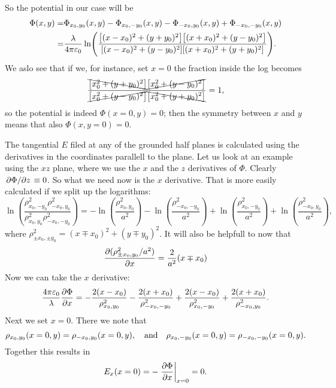 \documentclass[11pt,letter, swedish, english
]{article}
\newcommand{\enaught}{\ensuremath\varepsilon_0}
\begin{document}
So the potential in our case will be
\begin{equation}
\begin{aligned}
\Phi(x, y)=&\Phi_{x_0,y_0}(x, y)-\Phi_{x_0,-y_0}(x, y)
-\Phi_{-x_0,y_0}(x, y)+\Phi_{-x_0,-y_0}(x, y)\\
=&\frac{\lambda}{4\pi\enaught}
\ln(\frac{\qty[(x-x_0)^2+(y+y_0)^2]\qty[(x+x_0)^2+(y-y_0)^2]}
{\qty[(x-x_0)^2+(y-y_0)^2]\qty[(x+x_0)^2+(y+y_0)^2]}).
\end{aligned}
\end{equation}
We aslo see that if we, for instance, set $x=0$ the fraction inside
the log becomes
\begin{equation}
\frac{\bcancel{\qty[x_0^2+(y+y_0)^2]}\cancel{\qty[x_0^2+(y-y_0)^2]}}
{\cancel{\qty[x_0^2+(y-y_0)^2]}\bcancel{\qty[x_0^2+(y+y_0)^2]}}
=1,
\end{equation}
so the potential is indeed $\Phi(x=0, y)=0$; then the symmetry between
$x$ and $y$ means that also $\Phi(x, y=0)=0$.

The tangential $E$ filed at any of the grounded half planes is
calculated using the derivatives in the coordinates parallell to the
plane. Let us look at an example using the $xz$ plane, where we use the $x$
and the $z$ derivatives of $\Phi$. Clearly $\pdv*{\Phi}{z}\equiv0$. So
what we need now is the $x$ derivative. That is more easily calculated
if we split up the logarithms:
\begin{equation}
\ln(\frac{\rho_{x_0,-y_0}^2\rho_{-x_0,y_0}^2}
{\rho_{x_0,y_0}^2\rho_{-x_0,-y_0}^2})
=-\ln(\frac{\rho_{x_0,y_0}^2}{a^2})-\ln(\frac{\rho_{-x_0,-y_0}^2}{a^2})
+\ln(\frac{\rho_{x_0,-y_0}^2}{a^2})+\ln(\frac{\rho_{-x_0,y_0}^2}{a^2}),
\end{equation}
where $\rho_{\pm x_0,\pm y_0}^2=(x\mp x_0)^2+(y\mp y_0)^2$. It will
also be helpfull to now that
\begin{equation}
\pdv{(\rho_{\pm x_0,y_0}^2/a^2)}{x}=\frac{2}{a^2}(x\mp x_0)
\end{equation}
Now we can take the $x$ derivative:
\begin{equation}
\frac{4\pi\enaught}{\lambda}\pdv{\Phi}{x}
=-\frac{2(x-x_0)}{\rho_{x_0,y_0}^2}
-\frac{2(x+x_0)}{\rho_{-x_0,-y_0}^2}
+\frac{2(x-x_0)}{\rho_{x_0,-y_0}^2}
+\frac{2(x+x_0)}{\rho_{-x_0,y_0}^2}.
\end{equation}
Next we set $x=0$. There we note that
\begin{equation}
\rho_{x_0,y_0}(x=0, y)=\rho_{-x_0,y_0}(x=0, y)
\qcomma\text{and}\quad
\rho_{x_0,-y_0}(x=0, y)=\rho_{-x_0,-y_0}(x=0, y).
\end{equation}
Together this results in
\begin{equation}
E_x(x=0)=-\eval{\pdv{\Phi}{x}}_{x=0}=0.
\end{equation}
\end{document}
